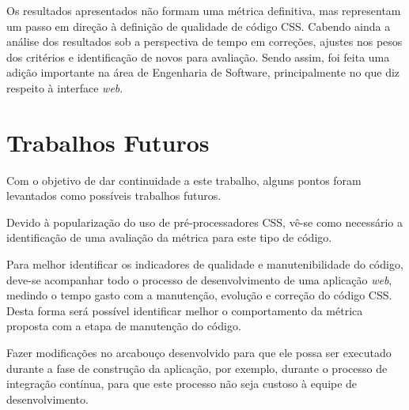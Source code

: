 Os resultados apresentados não formam uma métrica definitiva, mas representam um passo em direção à definição de qualidade de código CSS. Cabendo ainda a análise dos resultados sob a perspectiva de tempo em correções, ajustes nos pesos dos critérios e identificação de novos  para avaliação. Sendo assim, foi feita uma adição importante na área de Engenharia de Software, principalmente no que diz respeito à interface \textit{web}.

\section{Trabalhos Futuros}

Com o objetivo de dar continuidade a este trabalho, alguns pontos foram levantados como possíveis trabalhos futuros.

Devido à popularização do uso de pré-processadores CSS, vê-se como necessário a identificação de uma avaliação da métrica para este tipo de código.

Para melhor identificar os indicadores de qualidade e manutenibilidade do código, deve-se acompanhar todo o processo de desenvolvimento de uma aplicação \textit{web}, medindo o tempo gasto com a manutenção, evolução e correção do código CSS. Desta forma será possível identificar melhor o comportamento da métrica proposta com a etapa de manutenção do código.

Fazer modificações no arcabouço desenvolvido para que ele possa ser executado durante a fase de construção da aplicação, por exemplo, durante o processo de integração contínua, para que este processo não seja custoso à equipe de desenvolvimento.